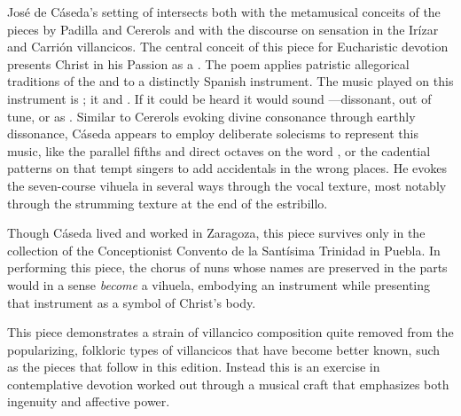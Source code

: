 José de Cáseda's setting of  intersects 
both with the metamusical conceits of the pieces by Padilla and Cererols and 
with the discourse on sensation in the Irízar and Carrión villancicos.
The central conceit of this piece for Eucharistic devotion presents Christ in 
his Passion as a .%
    \Autocite[375--405]{Cashner:PhD}
The poem applies patristic allegorical traditions of the  and 
 to a distinctly Spanish instrument.
The music played on this instrument is ; it 
 and .
If it could be heard it would sound ---dissonant, out of tune, or 
as . 
Similar to Cererols evoking divine consonance through earthly dissonance, 
Cáseda appears to employ deliberate solecisms to represent this 
music, like the parallel fifths and direct octaves on the 
word , or the cadential patterns on 
that tempt singers to add accidentals in the wrong places.
He evokes the seven-course vihuela in several ways through the vocal texture, 
most notably through the strumming texture at the end of the estribillo.

Though Cáseda lived and worked in Zaragoza, this piece survives only in the
collection of the Conceptionist Convento de la Santísima Trinidad in Puebla.%
    \Autocite{Favila:PhD}
In performing this piece, the chorus of nuns whose names are preserved in the 
parts would in a sense \emph{become} a vihuela, embodying an instrument while 
presenting that instrument as a symbol of Christ's body.

This piece demonstrates a strain of villancico composition quite removed from 
the popularizing, folkloric types of villancicos that have become better known,
such as the pieces that follow in this edition.  
Instead this is an exercise in contemplative devotion worked out through a
musical craft that emphasizes both ingenuity and affective power.


